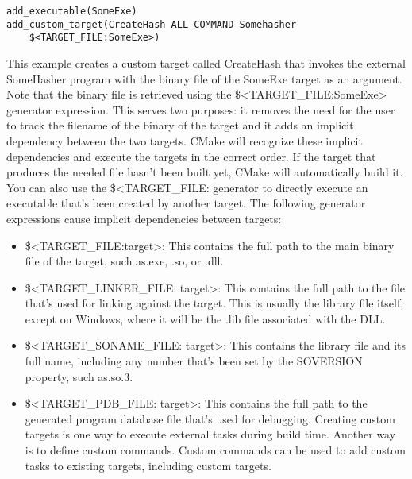 \begin{lstlisting}[style=styleCMake]
add_executable(SomeExe)
add_custom_target(CreateHash ALL COMMAND Somehasher
	$<TARGET_FILE:SomeExe>)
\end{lstlisting}

This example creates a custom target called CreateHash that invokes the external SomeHasher program with the binary file of the SomeExe target as an argument. Note that the binary file is retrieved using the \$<TARGET\_FILE:SomeExe> generator expression. This serves two purposes: it removes the need for the user to track the filename of the binary of the target and it adds an implicit dependency between the two targets. CMake will recognize these implicit dependencies and execute the targets in the correct order. If the target that produces the needed file hasn't been built yet, CMake will automatically build it. You can also use the \$<TARGET\_FILE: generator to directly execute an executable that's been created by another target. The following generator expressions cause implicit dependencies between targets:

\begin{itemize}
\item 
\$<TARGET\_FILE:target>: This contains the full path to the main binary file of the target, such as.exe, .so, or .dll.

\item 
\$<TARGET\_LINKER\_FILE: target>: This contains the full path to the file that's used for linking against the target. This is usually the library file itself, except on Windows, where it will be the .lib file associated with the DLL.

\item 
\$<TARGET\_SONAME\_FILE: target>: This contains the library file and its full name, including any number that's been set by the SOVERSION property, such as.so.3.

\item
\$<TARGET\_PDB\_FILE: target>: This contains the full path to the generated program database file that's used for debugging. Creating custom targets is one way to execute external tasks during build time. Another way is to define custom commands. Custom commands can be used to add custom tasks to existing targets, including custom targets.
\end{itemize}


